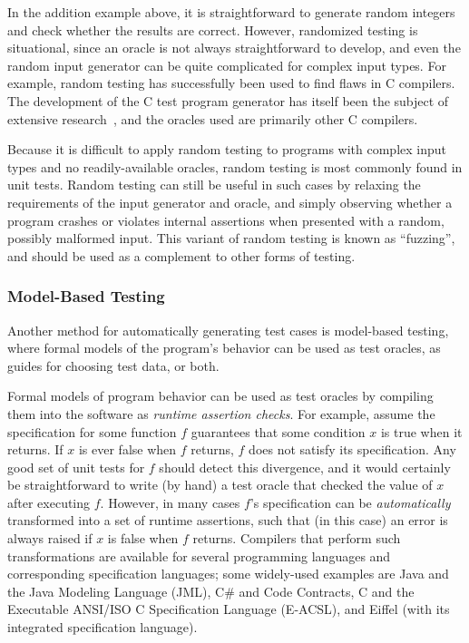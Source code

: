 In the addition example above, it is straightforward to generate
random integers and check whether the results are correct. However,
randomized testing is situational, since an oracle is not always
straightforward to develop, and even the random input generator can be
quite complicated for complex input types. For example, random testing
has successfully been used to find flaws in C compilers. The
development of the C test program generator has itself been the
subject of extensive research~\cite{yang2011finding}, and the oracles
used are primarily other C compilers.

Because it is difficult to apply random testing to programs with
complex input types and no readily-available oracles, random testing
is most commonly found in unit tests. Random testing can still be
useful in such cases by relaxing the requirements of the input
generator and oracle, and simply observing whether a program crashes
or violates internal assertions when presented with a random, possibly
malformed input. This variant of random testing is known as
``fuzzing'', and should be used as a complement to other forms of
testing.

\subsubsection{Model-Based Testing}

Another method for automatically generating test cases is model-based
testing, where formal models of the program's behavior can be used as
test oracles, as guides for choosing test data, or both.

Formal models of program behavior can be used as test oracles by
compiling them into the software as \emph{runtime assertion
  checks}. For example, assume the specification for some function $f$
guarantees that some condition $x$ is true when it returns. If $x$ is
ever false when $f$ returns, $f$ does not satisfy its
specification. Any good set of unit tests for $f$ should detect this
divergence, and it would certainly be straightforward to write (by
hand) a test oracle that checked the value of $x$ after executing
$f$. However, in many cases $f$'s specification can be
\emph{automatically} transformed into a set of runtime assertions,
such that (in this case) an error is always raised if $x$ is false
when $f$ returns.  Compilers that perform such transformations are
available for several programming languages and corresponding
specification languages; some widely-used examples are Java and the
Java Modeling Language (JML), C\# and Code Contracts, C and the
Executable ANSI/ISO C Specification Language (E-ACSL), and Eiffel
(with its integrated specification language).

